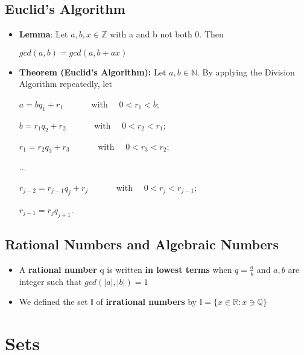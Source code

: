 \documentclass{report}
\begin{document}
	\section{Euclid's Algorithm}
		\begin{itemize}\addtolength{\leftskip}{2em}
			\item \textbf{Lemma}: Let $a,b,x\in\mathbb{Z}$ with a and b not both 0. Then
			\begin{center}
			$gcd(a,b)=gcd(a,b+ax)$
			\end{center}
			\item \textbf{Theorem (Euclid's Algorithm):} Let $a,b\in\mathbb{N}$. By applying the Division Algorithm repeatedly, let
			\begin{center}
				$a=bq_1+r_1\quad\quad\quad$ with $\quad 0<r_1<b$;
			\end{center}
			\begin{center}
				$b=r_1q_2+r_2\quad\quad\quad$ with $\quad 0<r_2<r_1$;
			\end{center}
			\begin{center}
				$r_1=r_2q_3+r_3\quad\quad\quad$ with $\quad 0<r_3<r_2$;
			\end{center}
			\begin{center}
			...
			\end{center}
			\begin{center}
				$r_{j-2}=r_{j-1}q_j+r_j\quad\quad\quad$ with $\quad 0<r_j<r_{j-1}$;
			\end{center}
			\begin{center}
				$r_{j-1}=r_jq_{j+1}$.
			\end{center}
		\end{itemize}
	\section{Rational Numbers and Algebraic Numbers}
		\begin{itemize}\addtolength{\leftskip}{2em}
			\item A \textbf{rational number} q is written \textbf{in lowest terms} when $q=\frac{a}{b}$ and $a,b$ are integer such that $gcd(|a|,|b|)=1$
			\item We defined the set $\mathbb{I}$ of \textbf{irrational numbers} by $\mathbb{I}=\{x\in\mathbb{R}:x\ni\mathbb{Q}\}$
		\end{itemize}

\chapter{Sets}
\end{document}
